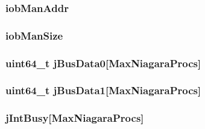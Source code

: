 \label{classIob_afce8ffd48792d932bbadab4bc5a0a158}
\hypertarget{classIob_a5b9c2a6c7833c638ac7f48f8d40d8826}{
\subsubsection[{iobManAddr}]{ {\bf iobManAddr}}}
\label{classIob_a5b9c2a6c7833c638ac7f48f8d40d8826}
\hypertarget{classIob_a70272f6df3d88fc8934351dda059264a}{
\subsubsection[{iobManSize}]{ {\bf iobManSize}}}
\label{classIob_a70272f6df3d88fc8934351dda059264a}
\hypertarget{classIob_a879d3a735fb02cc428ac1a00bd6ca1cd}{
\subsubsection[{jBusData0}]{\setlength{\rightskip}{0pt plus 5cm}uint64\_\-t {\bf jBusData0}\mbox{[}{\bf MaxNiagaraProcs}\mbox{]}}}
\label{classIob_a879d3a735fb02cc428ac1a00bd6ca1cd}
\hypertarget{classIob_adb2d55598e0489de9fe265747a544686}{
\subsubsection[{jBusData1}]{\setlength{\rightskip}{0pt plus 5cm}uint64\_\-t {\bf jBusData1}\mbox{[}{\bf MaxNiagaraProcs}\mbox{]}}}
\label{classIob_adb2d55598e0489de9fe265747a544686}
\hypertarget{classIob_a971401f936f065a7781d41a2cf198303}{
\subsubsection[{jIntBusy}]{ {\bf jIntBusy}\mbox{[}{\bf MaxNiagaraProcs}\mbox{]}}}
